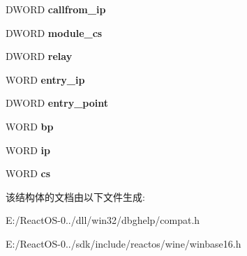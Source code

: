 \begin{DoxyCompactItemize}
\mbox{\label{struct___s_t_a_c_k16_f_r_a_m_e_a29837947ae7bdb9c78f122c894eca4e9}} 
D\+W\+O\+RD {\bfseries callfrom\+\_\+ip}
\item 
\mbox{\label{struct___s_t_a_c_k16_f_r_a_m_e_afcdf2e18c3125a72d912500af49b62a0}} 
D\+W\+O\+RD {\bfseries module\+\_\+cs}
\item 
\mbox{\label{struct___s_t_a_c_k16_f_r_a_m_e_a04e261d10388ce434fbd00667c20bb60}} 
D\+W\+O\+RD {\bfseries relay}
\item 
\mbox{\label{struct___s_t_a_c_k16_f_r_a_m_e_a99c7719e6a9af02e61021cb43e78cc66}} 
W\+O\+RD {\bfseries entry\+\_\+ip}
\item 
\mbox{\label{struct___s_t_a_c_k16_f_r_a_m_e_add6ac6f2767c0c5a7330fd541ca8ce98}} 
D\+W\+O\+RD {\bfseries entry\+\_\+point}
\item 
\mbox{\label{struct___s_t_a_c_k16_f_r_a_m_e_a1bba6c950e18d940f9300ad1854cd2e7}} 
W\+O\+RD {\bfseries bp}
\item 
\mbox{\label{struct___s_t_a_c_k16_f_r_a_m_e_a05798087b368a8d32e6d809684c15090}} 
W\+O\+RD {\bfseries ip}
\item 
\mbox{\label{struct___s_t_a_c_k16_f_r_a_m_e_a29c00b60f5a493135d44f8d1b90f2394}} 
W\+O\+RD {\bfseries cs}
\end{DoxyCompactItemize}


该结构体的文档由以下文件生成\+:\begin{DoxyCompactItemize}
\item 
E\+:/\+React\+O\+S-\/0../dll/win32/dbghelp/compat.\+h\item 
E\+:/\+React\+O\+S-\/0../sdk/include/reactos/wine/winbase16.\+h\end{DoxyCompactItemize}
